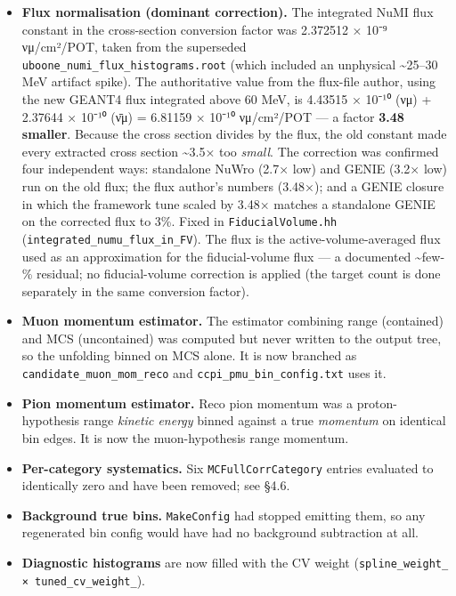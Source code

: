 \documentclass[11pt]{article}
\begin{document}
\begin{itemize}
\item \textbf{Flux normalisation (dominant correction).} The integrated NuMI flux constant in the cross-section conversion factor was 2.372512 × 10⁻⁹ νμ/cm²/POT, taken from the superseded \texttt{uboone\_numi\_flux\_histograms.root} (which included an unphysical \textasciitilde{}25–30 MeV artifact spike). The authoritative value from the flux-file author, using the new GEANT4 flux integrated above 60 MeV, is 4.43515 × 10⁻¹⁰ (νμ) + 2.37644 × 10⁻¹⁰ (ν̄μ) = 6.81159 × 10⁻¹⁰ νμ/cm²/POT — a factor \textbf{3.48 smaller}. Because the cross section divides by the flux, the old constant made every extracted cross section \textasciitilde{}3.5× too \emph{small}. The correction was confirmed four independent ways: standalone NuWro (2.7× low) and GENIE (3.2× low) run on the old flux; the flux author's numbers (3.48×); and a GENIE closure in which the framework tune scaled by 3.48× matches a standalone GENIE on the corrected flux to 3\%. Fixed in \texttt{FiducialVolume.hh} (\texttt{integrated\_numu\_flux\_in\_FV}). The flux is the active-volume-averaged flux used as an approximation for the fiducial-volume flux — a documented \textasciitilde{}few-\% residual; no fiducial-volume correction is applied (the target count is done separately in the same conversion factor).
\item \textbf{Muon momentum estimator.} The estimator combining range (contained) and MCS (uncontained) was computed but never written to the output tree, so the unfolding binned on MCS alone. It is now branched as \texttt{candidate\_muon\_mom\_reco} and \texttt{ccpi\_pmu\_bin\_config.txt} uses it.
\item \textbf{Pion momentum estimator.} Reco pion momentum was a proton-hypothesis range \emph{kinetic energy} binned against a true \emph{momentum} on identical bin edges. It is now the muon-hypothesis range momentum.
\item \textbf{Per-category systematics.} Six \texttt{MCFullCorrCategory} entries evaluated to identically zero and have been removed; see §4.6.
\item \textbf{Background true bins.} \texttt{MakeConfig} had stopped emitting them, so any regenerated bin config would have had no background subtraction at all.
\item \textbf{Diagnostic histograms} are now filled with the CV weight (\texttt{spline\_weight\_ × tuned\_cv\_weight\_}).
\end{itemize}
\end{document}
